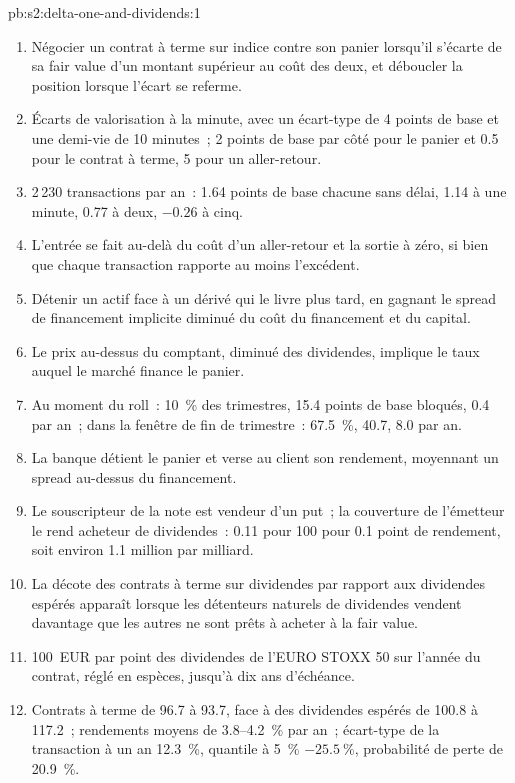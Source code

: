 \begin{solution}{pb:s2:delta-one-and-dividends:1}
\begin{enumerate}
\item Négocier un contrat à terme sur indice contre son panier lorsqu'il s'écarte de sa fair value d'un montant supérieur au coût des deux, et déboucler la position lorsque l'écart se referme.
\item Écarts de valorisation à la minute, avec un écart-type de 4 points de base et une demi-vie de 10 minutes~; 2 points de base par côté pour le panier et 0.5 pour le
contrat à terme, 5 pour un aller-retour.
\item 2\,230 transactions par an~: 1.64 points de base chacune sans délai, 1.14 à une minute, 0.77 à deux, $-0.26$ à cinq.
\item L'entrée se fait au-delà du coût d'un aller-retour et la sortie à zéro, si bien que chaque transaction rapporte au moins l'excédent.
\item Détenir un actif face à un dérivé qui le livre plus tard, en gagnant le spread de financement implicite diminué du coût du financement et du capital.
\item Le prix au-dessus du comptant, diminué des dividendes, implique le taux auquel le marché finance le panier.
\item Au moment du roll~: 10~\% des trimestres, 15.4 points de base bloqués, 0.4 par an~; dans la fenêtre de fin de trimestre~: 67.5~\%, 40.7, 8.0 par an.
\item La banque détient le panier et verse au client son rendement, moyennant un spread au-dessus du financement.
\item Le souscripteur de la note est vendeur d'un put~; la couverture de l'émetteur le rend acheteur de dividendes~: 0.11 pour 100 pour 0.1 point de rendement, soit environ 1.1 million par milliard.
\item La décote des contrats à terme sur dividendes par rapport aux dividendes espérés apparaît lorsque les détenteurs naturels de dividendes vendent davantage que les autres ne sont prêts à acheter à la fair value.
\item 100~EUR par point des dividendes de l'EURO STOXX 50 sur l'année du contrat, réglé en espèces, jusqu'à dix ans d'échéance.
\item Contrats à terme de 96.7 à 93.7, face à des dividendes espérés de 100.8 à 117.2~; rendements moyens de 3.8--4.2~\% par an~; écart-type de la transaction à un an
12.3~\%, quantile à 5~\% $-25.5~\%$, probabilité de perte de 20.9~\%.

\end{enumerate}
\end{solution}
